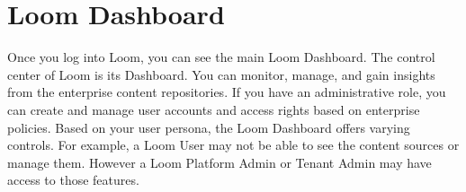\documentclass[letterpaper,10pt,english]{sphinxmanual}
\begin{document}
\section{Loom Dashboard}
\label{\detokenize{loom_getting_started_guide:loom-dashboard}}
Once you log into Loom, you can see the main Loom Dashboard. The control center of Loom is its Dashboard.  You can monitor, manage, and gain insights from the enterprise content repositories. If you have an administrative role, you can create and manage user accounts and access rights based on enterprise policies.  Based on your user persona, the Loom Dashboard offers varying controls. For example, a Loom User may not be able to see the content sources or manage them. However a Loom Platform Admin or Tenant Admin may have access to those features.
\label{\detokenize{loom_getting_started_guide:loom-dashboard-ui}}
\end{document}
